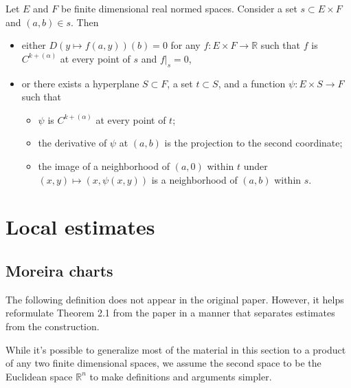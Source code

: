 \begin{theorem}%
  \label{thm:cdh-at-implicit-dichotomy}
  Let \(E\) and \(F\) be finite dimensional real normed spaces.
  Consider a set \(s \subset E \times F\) and \((a, b) \in s\).
  Then
  \begin{itemize}
  \item either \(D(y \mapsto f(a, y))(b) = 0\) for any \(f\colon E \times F\to \mathbb R\)
    such that \(f\) is \(C^{k+(\alpha)}\) at every point of \(s\) and \(\left.f\right|_{s}=0\),
  \item or there exists a hyperplane \(S \subset F\), a set \(t \subset S\), and a function \(\psi\colon E \times S \to F\) such that
    \begin{itemize}
    \item \(\psi\) is \(C^{k+(\alpha)}\) at every point of \(t\);
    \item the derivative of \(\psi\) at \((a, b)\) is the projection to the second coordinate;
    \item the image of a neighborhood of \((a, 0)\) within \(t\) under \((x, y) \mapsto (x, \psi(x, y))\)
      is a neighborhood of \((a, b)\) within \(s\).
    \end{itemize}
  \end{itemize}
\end{theorem}

\chapter{Local estimates}%
\label{cha:local-estimates}

\section{Moreira charts}%
\label{sec:moreira-chart}

The following definition does not appear in the original paper.
However, it helps reformulate Theorem 2.1 from the paper
in a manner that separates estimates from the construction.

While it's possible to generalize most of the material in this section
to a product of any two finite dimensional spaces,
we assume the second space to be the Euclidean space \(\mathbb R^{n}\)
to make definitions and arguments simpler.

